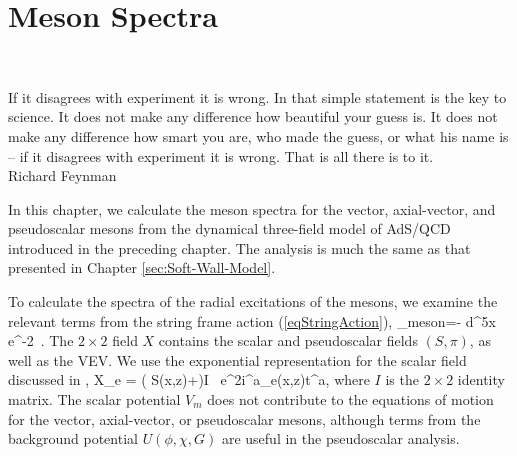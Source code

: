 \chapter{Meson Spectra}
\label{ch:meson_spectra}
\begin{minipage}[r]{0.333\textwidth}
 $ \left. \right.$
\end{minipage}
\begin{minipage}[c]{0.667\textwidth}
\begin{flushright}
If it disagrees with experiment it is wrong. In that simple statement
is the key to science. It does not make any difference how beautiful
your guess is. It does not make any difference how smart you are, who
made the guess, or what his name is -- if it disagrees with experiment
it is wrong. That is all there is to it. \\ Richard Feynman
\end{flushright}
\end{minipage}
\vspace*{\baselineskip}

In this chapter, we calculate the meson spectra for the vector, axial-vector, and pseudoscalar mesons from the dynamical three-field model of AdS/QCD introduced in the preceding chapter.
The analysis is much the same as that presented in Chapter \ref{sec:Soft-Wall-Model}.

To calculate the spectra of the radial excitations of the mesons, we examine the relevant terms from the string frame action (\ref{eqStringAction}),
\ba
\cS_{{\rm meson}}=- \int d^5x  e^{-2\Phi} \, .
\label{eqMesonL}
\ea
The $2 \times 2$ field $X$ contains the scalar and pseudoscalar fields $(S,\pi)$, as well as the VEV.
We use the exponential representation for the scalar field discussed in \cite{bartz-pions},
\be
X_e = \left( S(x,z)+\right)I \, e^{2i\pi^a_e(x,z)t^a},
\ee
where $I$ is the $2\times2$ identity matrix.
The scalar potential $V_m$ does not contribute to the equations of motion for the vector, axial-vector, or pseudoscalar mesons, although terms from the background potential $U(\phi,\chi, G)$ are useful in the pseudoscalar analysis.

